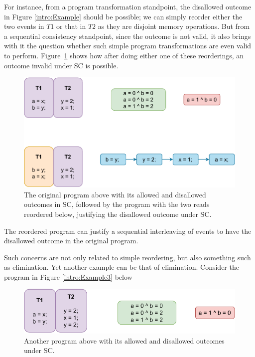     For instance, from a program transformation standpoint, the disallowed outcome in Figure \ref{intro:Example} should be possible; we can simply reorder either the two events in $T1$ or that in $T2$ as they are disjoint memory operations. 
    But from a sequential consistency standpoint, since the outcome is not valid, it also brings with it the question whether such simple program transformations are even valid to perform.
    Figure~\ref{intro:Example2} shows how after doing either one of these reorderings, an outcome invalid under SC is possible. 
    \begin{figure}[H]
        \centering
        \includegraphics[scale=0.7]{2.Background/SC_Example1(b).pdf}
        \caption{The original program above with its allowed and disallowed outcomes in SC, followed by the program with the two reads reordered below, justifying the disallowed outcome under SC.}
        \label{intro:Example2}
    \end{figure}

    The reordered program can justify a sequential interleaving of events to have the disallowed outcome in the original program. 

    Such concerns are not only related to simple reordering, but also something such as elimination. 
    Yet another example can be that of elimination. Consider the program in Figure \ref{intro:Example3} below
    \begin{figure}[H]
        \centering
        \includegraphics[scale=0.7]{2.Background/SC_Example2(a).pdf}
        \caption{Another program above with its allowed and disallowed outcomes under SC.}
        \label{intro:Example3(a)}
    \end{figure}


